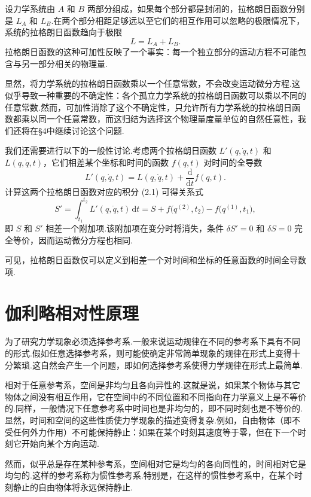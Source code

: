 设力学系统由 $A$ 和 $B$ 两部分组成，如果每个部分都是封闭的，拉格朗日函数分别是 $L_A$ 和 $L_B$.在两个部分相距足够远以至它们的相互作用可以忽略的极限情况下，系统的拉格朗日函数趋向于极限
\begin{equation}
  L=L_A+L_B.
\end{equation}
拉格朗日函数的这种可加性反映了一个事实：每一个独立部分的运动方程不可能包含与另一部分相关的物理量.

显然，将力学系统的拉格朗日函数乘以一个任意常数，不会改变运动微分方程.这似乎导致一种重要的不确定性：各个孤立力学系统的拉格朗日函数可以乘以不同的任意常数.然而，可加性消除了这个不确定性，只允许所有力学系统的拉格朗日函数都乘以同一个任意常数，而这归结为选择这个物理量度量单位的自然任意性，我们还将在§4中继续讨论这个问题.

我们还需要进行以下的一般性讨论.考虑两个拉格朗日函数 $L'(q,\dot{q},t)$ 和 $L(q,\dot{q},t)$，它们相差某个坐标和时间的函数 $f(q,t)$ 对时间的全导数
\begin{equation}
  L'(q,\dot{q},t)=L(q,\dot{q},t)+\frac{\mathrm{d}}{\mathrm{d}t}f(q,t).
\end{equation}
计算这两个拉格朗日函数对应的积分 (2.1) 可得关系式
\begin{equation*}
  S'=\int_{t_1}^{t_2}L'(q,\dot{q},t)\,\mathrm{d}t
  =S+f\bigl(q^{(2)},t_2\bigr)-f\bigl(q^{(1)},t_1\bigr),
\end{equation*}
即 $S$ 和 $S'$ 相差一个附加项.该附加项在变分时将消失，条件 $\delta S'=0$ 和 $\delta S=0$ 完全等价，因而运动微分方程也相同.

可见，拉格朗日函数仅可以定义到相差一个对时间和坐标的任意函数的时间全导数项.

\section{伽利略相对性原理}

为了研究力学现象必须选择参考系.一般来说运动规律在不同的参考系下具有不同的形式.假如任意选择参考系，则可能使确定非常简单现象的规律在形式上变得十分繁琐.这自然会产生一个问题，即如何选择参考系使得力学规律在形式上最简单.

相对于任意参考系，空间是非均匀且各向异性的.这就是说，如果某个物体与其它物体之间没有相互作用，它在空间中的不同位置和不同指向在力学意义上是不等价的.同样，一般情况下任意参考系中时间也是非均匀的，即不同时刻也是不等价的.显然，时间和空间的这些性质使力学现象的描述变得复杂.例如，自由物体（即不受任何外力作用）不可能保持静止：如果在某个时刻其速度等于零，但在下一个时刻它开始向某个方向运动.

然而，似乎总是存在某种参考系，空间相对它是均匀的各向同性的，时间相对它是均匀的.这样的参考系称为惯性参考系.特别是，在这样的惯性参考系中，在某个时刻静止的自由物体将永远保持静止.

